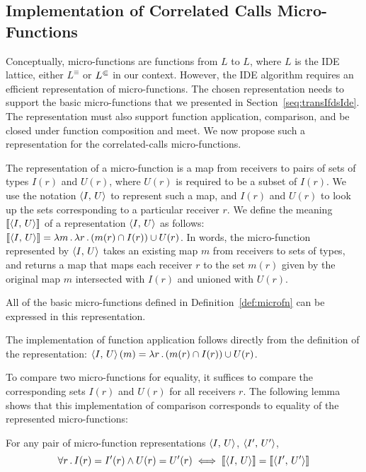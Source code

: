 \subsection{Implementation of Correlated Calls Micro-Functions}

Conceptually, micro-functions are functions from $L$ to $L$, where $L$
is the IDE lattice, either $L^\equiv$ or $L^\Subset$ in our context. However,
the IDE algorithm requires an efficient representation of micro-functions.
The chosen representation needs to support the basic micro-functions that
we presented in Section~\ref{seq:transIfdsIde}. The representation must also
support function application, comparison, and be closed under function composition
and meet. We now propose such a representation for the correlated-calls micro-functions.

The representation of a micro-function is a map from receivers to pairs of sets of
types $I(r)$ and $U(r)$, where $U(r)$ is required to be a subset of $I(r)$. We use the notation
$\left\langle I,\,U\right\rangle$ to represent such a map, and $I(r)$ and $U(r)$ to look up the
sets corresponding to a particular receiver $r$. We define the meaning $\left\llbracket\left\langle I,\,U\right\rangle\right\rrbracket$
of a representation $\left\langle I,\,U\right\rangle$ as follows: $\left\llbracket\left\langle I,\,U\right\rangle\right\rrbracket = \lambda m\,.\,\lambda r\,.\,(m(r) \cap I(r)) \cup U(r)$.
In words, the micro-function represented by $\left\langle I,\,U\right\rangle$ takes an existing map $m$
from receivers to sets of types, and returns a map that maps each receiver $r$ to
the set $m(r)$ given by the original map $m$ intersected with $I(r)$ and unioned
with $U(r)$.

All of the basic micro-functions defined in Definition~\ref{def:microfn} can be expressed
in this representation.

The implementation of function application follows directly from the definition of
the representation: $\left\langle I,\,U\right\rangle(m) = \lambda r\,.\,(m(r) \cap I(r)) \cup U(r)$.

To compare two micro-functions for equality, it suffices to compare the corresponding
sets $I(r)$ and $U(r)$ for all receivers $r$. The following lemma shows that this
implementation of comparison corresponds to equality of the represented micro-functions:
\begin{lemma}\label{lem:equal}
    For any pair of micro-function representations $\left\langle I,\,U\right\rangle$, $\left\langle I',\,U'\right\rangle$,
    \[
        \forall r\,.\,I(r) = I'(r) \land U(r) = U'(r)
        \iff
        \left\llbracket\left\langle I,\,U\right\rangle\right\rrbracket = \left\llbracket\left\langle I',\,U'\right\rangle\right\rrbracket
    \] 
\end{lemma}

